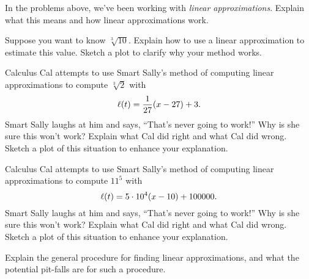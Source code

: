 \documentclass{ximera}
\begin{document}
\begin{problem}
In the problems above, we've been working with \textit{linear
approximations}. Explain what this means and how linear approximations
work.
\end{problem}

\begin{problem}
Suppose you want to know $\sqrt[3]{10}$. Explain how to use a linear
approximation to estimate this value. Sketch a plot to clarify why
your method works.
\end{problem}


\begin{problem}
Calculus Cal attempts to use Smart Sally's method of computing linear
approximations to compute $\sqrt[3]{2}$ with
\[
\ell(t) = \frac{1}{27}(x-27)+3.
\] 
Smart Sally laughs at him and says, ``That's never going to work!''
Why is she sure this won't work? Explain what Cal did right and what
Cal did wrong. Sketch a plot of this situation to enhance your
explanation.
\end{problem}

\begin{problem}
Calculus Cal attempts to use Smart Sally's method of computing linear
approximations to compute $11^5$ with
\[
\ell(t) = 5\cdot 10^4(x-10)+100000.
\] 
Smart Sally laughs at him and says, ``That's never going to work!''
Why is she sure this won't work? Explain what Cal did right and what
Cal did wrong. Sketch a plot of this situation to enhance your
explanation.
\end{problem}

\begin{problem}
Explain the general procedure for finding linear approximations, and
what the potential pit-falls are for such a procedure.
\end{problem}






\end{document}
